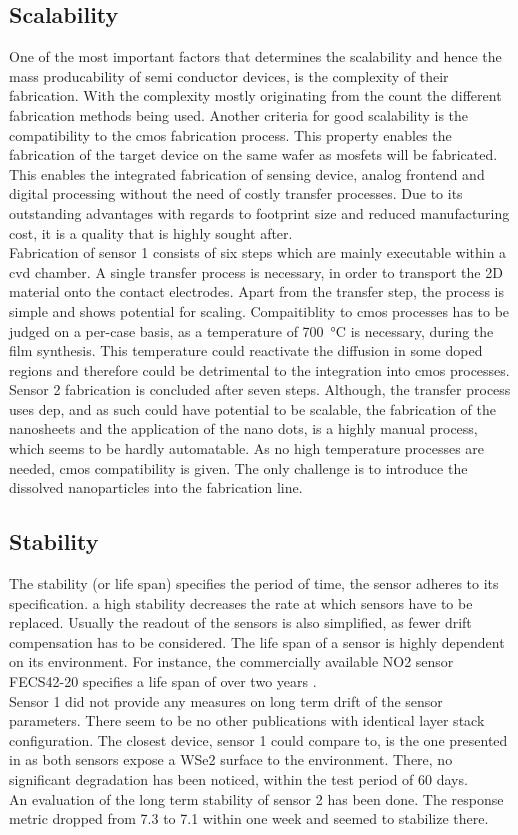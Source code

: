 \subsection{Scalability}
One of the most important factors that determines the scalability and hence the mass producability of semi conductor devices, is the complexity of their fabrication. With the complexity mostly originating from the count the different fabrication methods being used. Another criteria for good scalability is the compatibility to the \gls{cmos} fabrication process. This property enables the fabrication of the target device on the same wafer as \glspl{mosfet} will be fabricated. This enables the integrated fabrication of sensing device, analog frontend and digital processing without the need of costly transfer processes. Due to its outstanding advantages with regards to footprint size and reduced manufacturing cost, it is a quality that is highly sought after.\\
Fabrication of sensor 1 consists of six steps which are mainly executable within a \gls{cvd} chamber. A single transfer process is necessary, in order to transport the 2D material onto the contact electrodes. Apart from the transfer step, the process is simple and shows potential for scaling. Compaitiblity to \gls{cmos} processes has to be judged on a per-case basis, as a temperature of \SI{700}{\celsius} is necessary, during the film synthesis. This temperature could reactivate the diffusion in some doped regions and therefore could be detrimental to the integration into \gls{cmos} processes.\\
Sensor 2 fabrication is concluded after seven steps. Although, the transfer process uses \gls{dep}, and as such could have potential to be scalable, the fabrication of the nanosheets and the application of the nano dots, is a highly manual process, which seems to be hardly automatable. As no high temperature processes are needed, \gls{cmos} compatibility is given. The only challenge is to introduce the dissolved nanoparticles into the fabrication line.
\subsection{Stability}
The stability (or life span) specifies the period of time, the sensor adheres to its specification. a high stability decreases the rate at which sensors have to be replaced. Usually the readout of the sensors is also simplified, as fewer drift compensation has to be considered. The life span of a sensor is highly dependent on its environment. For instance, the commercially available NO2 sensor FECS42-20 specifies a life span of over two years \cite{Figaro}. \\ 
Sensor 1 did not provide any measures on long term drift of the sensor parameters. There seem to be no other publications with identical layer stack configuration. The closest device, sensor 1 could compare to, is the one presented in \cite{Wu2020} as both sensors expose a WSe2 surface to the environment. There, no significant degradation has been noticed, within the test period of 60 days. \\
An evaluation of the long term stability of sensor 2 has been done. The response metric dropped from 7.3 to 7.1 within one week and seemed to stabilize there.

